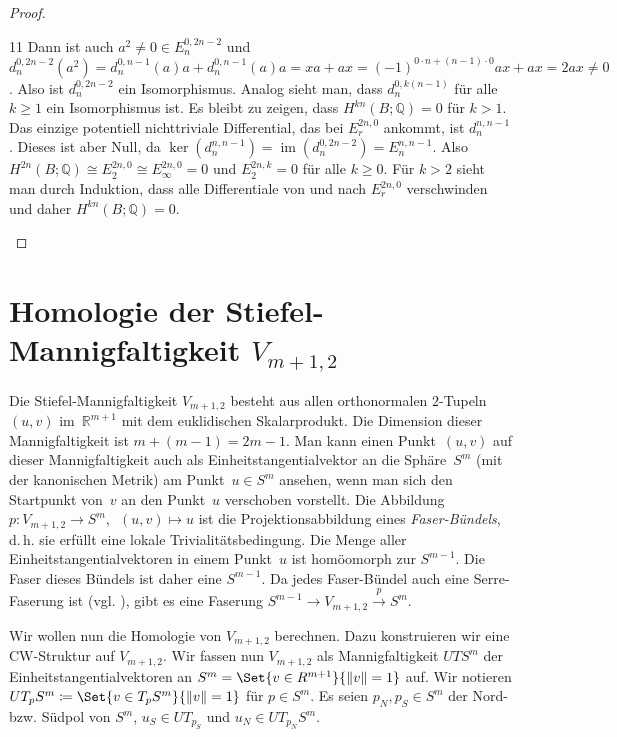 \documentclass[11pt, a4paper, german]{article}
\theoremstyle{definition}
\theoremstyle{remark}
\newcommand{\R}{\mathbb{R}} %
\newcommand{\Q}{\mathbb{Q}} %
\DeclareMathOperator{\im}{im} %
\DeclarePairedDelimiter\norm{\lVert}{\rVert} %
\newcommand{\V}[2]{V_{{#2},{#1}}} %
\begin{document}
\begin{proof}
\begin{cutout}{0}{0pt}{\dimexpr\linewidth-5.5cm\relax}{11}
    Dann ist auch $a^2 \neq 0 \in E_n^{0,2n-2}$ und $d_n^{0,2n-2}(a^2) = d_n^{0,n-1}(a)a + d_n^{0,n-1}(a)a = xa + ax = (-1)^{0 \cdot n + (n-1) \cdot 0} ax + ax = 2ax \neq 0$.
    Also ist $d_n^{0,2n-2}$ ein Isomorphismus.
    Analog sieht man, dass $d_n^{0,k(n-1)}$ für alle $k \geq 1$ ein Isomorphismus ist.
    Es bleibt zu zeigen, dass $H^{kn}(B; \Q) = 0$ für $k > 1$.
    Das einzige potentiell nichttriviale Differential, das bei $E_r^{2n,0}$ ankommt, ist $d_n^{n,n-1}$.
    Dieses ist aber Null, da $\ker(d_n^{n,n-1}) = \im(d_n^{0,2n-2}) = E_n^{n,n-1}$.
    Also $H^{2n}(B; \Q) \cong E_2^{2n,0} \cong E_\infty^{2n,0} = 0$ und $E_2^{2n,k} = 0$ für alle $k \geq 0$.
    Für $k > 2$ sieht man durch Induktion, dass alle Differentiale von und nach $E_r^{2n,0}$ verschwinden und daher $H^{kn}(B; \Q) = 0$. \qedhere
  \end{cutout}
\end{proof}

\section{Homologie der Stiefel-Mannigfaltigkeit $\V{2}{m+1}$}

Die Stiefel-Mannigfaltigkeit $\V{2}{m+1}$ besteht aus allen orthonormalen $2$-Tupeln~$(u, v)$ im~$\R^{m+1}$ mit dem euklidischen Skalarprodukt.
Die Dimension dieser Mannigfaltigkeit ist $m + (m-1) = 2m - 1$.
Man kann einen Punkt~$(u, v)$ auf dieser Mannigfaltigkeit auch als Einheitstangentialvektor an die Sphäre~$S^m$ (mit der kanonischen Metrik) am Punkt~$u \in S^m$ ansehen, wenn man sich den Startpunkt von~$v$ an den Punkt~$u$ verschoben vorstellt.
Die Abbildung $p : \V{2}{m+1} \to S^m, \enspace (u, v) \mapsto u$ ist die Projektionsabbildung eines \emph{Faser-Bündels}, d.\,h. sie erfüllt eine lokale Trivialitätsbedingung.
Die Menge aller Einheitstangentialvektoren in einem Punkt~$u$ ist homöomorph zur $S^{m-1}$.
Die Faser dieses Bündels ist daher eine $S^{m-1}$.
Da jedes Faser-Bündel auch eine Serre-Faserung ist (vgl. \cite[\mbox{} Prop 4.48]{hatcher:at}), gibt es eine Faserung $S^{m-1} \to \V{2}{m+1} \xrightarrow{p} S^m$.

Wir wollen nun die Homologie von $\V{2}{m+1}$ berechnen.
Dazu konstruieren wir eine CW-Struktur auf $\V{2}{m+1}$.
Wir fassen nun $\V{2}{m+1}$ als Mannigfaltigkeit $UT S^m$ der Einheitstangentialvektoren an $S^m = \Set{v \in R^{m+1}}{\norm{v} = 1}$ auf.
Wir notieren $UT_p S^m \coloneqq \Set{v \in T_p S^m}{\norm{v} = 1}$ für $p \in S^m$.
Es seien $p_N, p_S \in S^m$ der Nord- bzw. Südpol von $S^m$, $u_S \in UT_{p_S}$ und $u_N \in UT_{p_N} S^m$.
\end{document}
